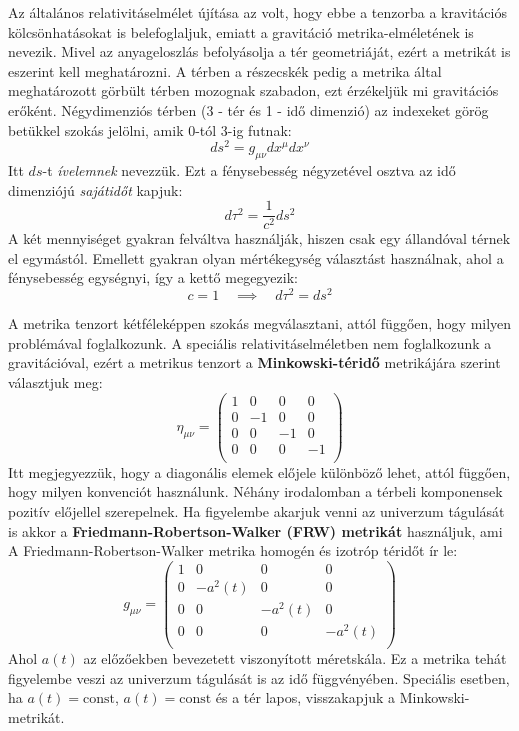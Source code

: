 \documentclass[../main.tex]{subfiles}
\begin{document}
Az általános relativitáselmélet újítása az volt, hogy ebbe a tenzorba a kravitációs kölcsönhatásokat is belefoglaljuk, emiatt a gravitáció metrika-elméletének is nevezik.
Mivel az anyageloszlás befolyásolja a tér geometriáját, ezért a metrikát is eszerint kell meghatározni. A térben a részecskék pedig a metrika által meghatározott görbült térben mozognak szabadon,
ezt érzékeljük mi gravitációs erőként. Négydimenziós térben (3 - tér és 1 - idő dimenzió) az indexeket görög betükkel szokás jelölni, amik 0-tól 3-ig futnak:
\begin{equation}
    ds^2 = g_{\mu \nu} dx^{\mu} dx^{\nu}
\end{equation}
Itt $ds$-t \textit{ívelemnek} nevezzük. Ezt a fénysebesség négyzetével osztva az idő dimenziójú \textit{sajátidőt} kapjuk:
\begin{equation}
    d\tau^2 = \frac{1}{c^2} ds^2
\end{equation}
A két mennyiséget gyakran felváltva használják, hiszen csak egy állandóval térnek el egymástól. Emellett gyakran olyan mértékegység választást használnak, ahol a fénysebesség egységnyi, így
a kettő megegyezik:
\begin{equation}
    c = 1 \quad \implies \quad d\tau^2 = ds^2
\end{equation}

A metrika tenzort kétféleképpen szokás megválasztani, attól függően, hogy milyen problémával foglalkozunk. A speciális relativitáselméletben nem foglalkozunk a gravitációval, ezért a metrikus tenzort a 
\textbf{Minkowski-téridő} metrikájára szerint választjuk meg:
\begin{equation}
    \eta_{\mu \nu} = \begin{pmatrix}
        1 & 0 & 0 & 0 \\
        0 & -1 & 0 & 0 \\
        0 & 0 & -1 & 0 \\
        0 & 0 & 0 & -1 \\
    \end{pmatrix}
\end{equation}
Itt megjegyezzük, hogy a diagonális elemek előjele különböző lehet, attól függően, hogy milyen konvenciót használunk. Néhány irodalomban a térbeli komponensek pozitív előjellel szerepelnek.
Ha figyelembe akarjuk venni az univerzum tágulását is akkor a \textbf{Friedmann-Robertson-Walker (FRW) metrikát} használjuk, ami A Friedmann-Robertson-Walker metrika homogén és izotróp téridőt ír le:
\begin{equation}
    g_{\mu \nu} = \begin{pmatrix}
        1 & 0 & 0 & 0 \\
        0 & -a^2(t) & 0 & 0 \\
        0 & 0 & -a^2(t) & 0 \\
        0 & 0 & 0 & -a^2(t) \\
    \end{pmatrix}
\end{equation}
Ahol $a(t)$ az előzőekben bevezetett viszonyított méretskála. Ez a metrika tehát figyelembe veszi az univerzum tágulását is az idő függvényében. Speciális esetben, ha $a(t)=\text{const}$, $a(t)=\text{const}$ és a tér lapos, visszakapjuk a Minkowski-metrikát.
\end{document}
